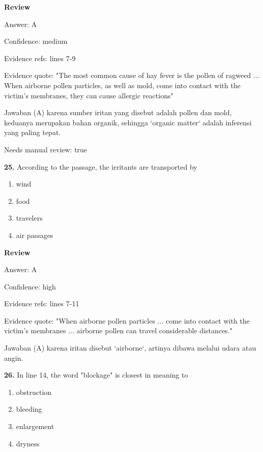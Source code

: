 \documentclass[12pt]{article}
\begin{document}
\par
\begingroup
\setlength{\parskip}{0pt}
\setlength{\parindent}{0pt}
\textbf{Review}\par
Answer: A\par
Confidence: medium\par
Evidence refs: lines 7-9\par
Evidence quote: "The most common cause of hay fever is the pollen of ragweed ... When airborne pollen particles, as well as mold, come into contact with the victim's membranes, they can cause allergic reactions"\par
Jawaban (A) karena sumber iritan yang disebut adalah pollen dan mold, keduanya merupakan bahan organik, sehingga `organic matter` adalah inferensi yang paling tepat.\par
Needs manual review: true\par
\endgroup
\par
\vspace{0.25\baselineskip}
\noindent\textbf{25.} According to the passage, the irritants are transported by
\begin{enumerate}[label=(\Alph*),leftmargin=*,itemsep=0.2em]
\item wind
\item food
\item travelers
\item air passages
\end{enumerate}
\par
\begingroup
\setlength{\parskip}{0pt}
\setlength{\parindent}{0pt}
\textbf{Review}\par
Answer: A\par
Confidence: high\par
Evidence refs: lines 7-11\par
Evidence quote: "When airborne pollen particles ... come into contact with the victim's membranes ... airborne pollen can travel considerable distances."\par
Jawaban (A) karena iritan disebut `airborne`, artinya dibawa melalui udara atau angin.\par
\endgroup
\par
\vspace{0.25\baselineskip}
\noindent\textbf{26.} In line 14, the word "blockage" is closest in meaning to
\begin{enumerate}[label=(\Alph*),leftmargin=*,itemsep=0.2em]
\item obstruction
\item bleeding
\item enlargement
\item dryness
\end{enumerate}
\end{document}
